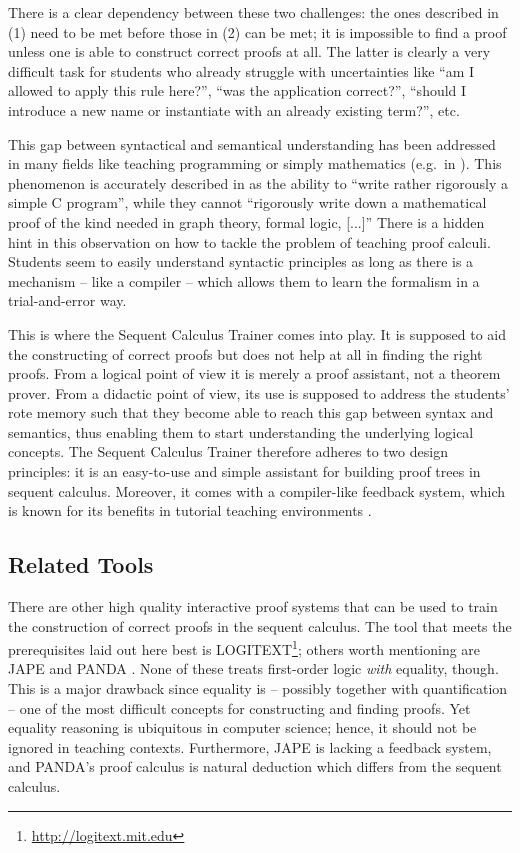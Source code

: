 \documentclass[a4paper,UKenglish]{lipics}
\begin{document}
There is a clear dependency between these two challenges: the ones described in (1) need to be met before those in (2) can be met; it is impossible to
find a proof unless one is able to construct correct proofs at all. The latter is clearly a very difficult task for students who already struggle with 
uncertainties like ``am I allowed to apply this rule here?'', ``was the application correct?'', ``should I introduce a new name or instantiate with 
an already existing term?'', etc.

This gap between syntactical and semantical understanding has been addressed in many
fields like teaching programming or simply mathematics (e.g.\ in \cite{DBLP:journals/ijpp/ShneidermanM79}).  This phenomenon is accurately described in
\cite{DBLP:conf/ticttl/GasquetSS11a} as the ability to ``write rather rigorously a simple C program'', while they cannot ``rigorously write down a
mathematical proof of the kind needed in graph theory, formal logic, [...]''  There is a hidden hint in this observation on how to tackle the problem
of teaching proof calculi. Students seem to easily understand syntactic principles as long as there is a mechanism -- like a compiler -- which allows them 
to learn the formalism in a trial-and-error way.

This is where the Sequent Calculus Trainer comes into play. It is supposed to aid the constructing of correct proofs but does not help at all in finding 
the right proofs. From a logical point of view it is merely a proof assistant, not a theorem prover. From a didactic point of view, its use is supposed
to address the students' rote memory such that they become able to reach this gap between syntax and semantics, thus enabling them to start understanding
the underlying logical concepts. The Sequent Calculus Trainer therefore adheres to two design principles: it is an easy-to-use and simple assistant for
building proof trees in sequent calculus. Moreover, it comes with a compiler-like feedback system, which is known for its benefits in tutorial
teaching environments \cite{Anderson1995}.
 
\subsection{Related Tools}
There are other high quality interactive proof systems that can be used to train the construction of correct proofs in the sequent calculus. The tool that
meets the prerequisites laid out here best is LOGITEXT\footnote{\url{http://logitext.mit.edu}}; others worth mentioning are JAPE \cite{DBLP:journals/cj/BornatS99} and PANDA
\cite{DBLP:conf/ticttl/GasquetSS11a}. None of these treats first-order logic \emph{with} equality, though. This is a major drawback since equality is --
possibly together with quantification -- one of the most difficult concepts for constructing and finding proofs. Yet equality reasoning is ubiquitous in
computer science; hence, it should not be ignored in teaching contexts. Furthermore, JAPE is lacking a feedback system, and PANDA's proof calculus is
natural deduction which differs from the sequent calculus. 
\end{document}
